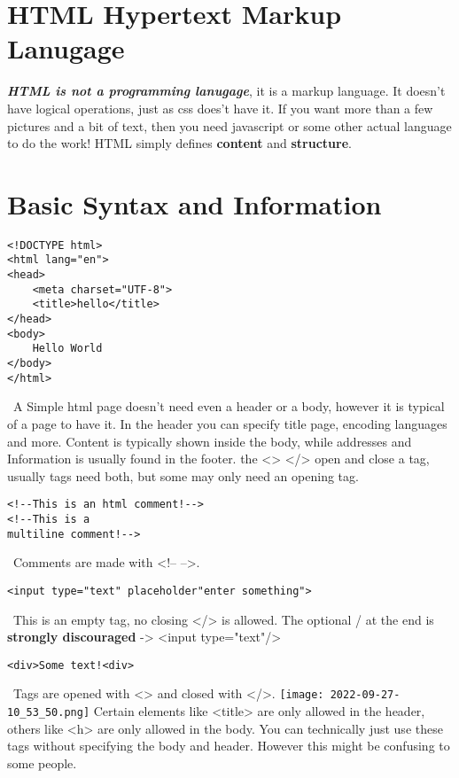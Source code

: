 \documentclass[main.tex,fontsize=6pt,paper=a4,paper=landscape,DIV=calc,]{scrartcl}
\begin{document}
\begin{multicols*}{4}
\section{HTML Hypertext Markup Lanugage}

\textbf{\emph{HTML is not a programming lanugage}}, it is a markup language. It doesn't have logical operations, just as css does't have it. If you want more than a few pictures and a bit of text, then you need javascript or some other actual language to do the work!\newline
HTML simply defines \textbf{content} and \textbf{structure}.


\section{Basic Syntax and Information}
\begin{lstlisting}
<!DOCTYPE html>
<html lang="en">
<head>
    <meta charset="UTF-8">
    <title>hello</title>
</head>
<body>
    Hello World
</body>
</html>
\end{lstlisting}
\, \newline
A Simple html page doesn't need even a header or a body, however it is typical of a page to have it.\newline
In the header you can specify title page, encoding languages and more.\newline
Content is typically shown inside the body, while addresses and Information is usually found in the footer.\newline
the <> </> open and close a tag, usually tags need both, but some may only need an opening tag.
\begin{lstlisting}
<!--This is an html comment!-->
<!--This is a 
multiline comment!-->
\end{lstlisting}
\, \newline
Comments are made with <!-- -->.
\begin{lstlisting}
<input type="text" placeholder"enter something">
\end{lstlisting}
\, \newline
This is an empty tag, no closing </> is allowed. \newline
The optional / at the end is \textbf{strongly discouraged} -> <input type="text"/>
\begin{lstlisting}
<div>Some text!<div>
\end{lstlisting}
\, \newline
Tags are opened with <> and closed with </>.
\texttt{[image: 2022-09-27-10\_53\_50.png]}
Certain elements like <title> are only allowed in the header, others like <h> are only allowed in the body.\newline
You can technically just use these tags without specifying the body and header.\newline
However this might be confusing to some people.



\end{multicols*}
\end{document}
